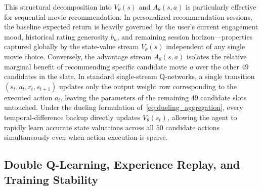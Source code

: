 This structural decomposition into $V_\theta(s)$ and $A_\theta(s, a)$ is particularly effective for sequential movie recommendation. In personalized recommendation sessions, the baseline expected return is heavily governed by the user's current engagement mood, historical rating generosity $b_u$, and remaining session horizon---properties captured globally by the state-value stream $V_\theta(s)$ independent of any single movie choice. Conversely, the advantage stream $A_\theta(s, a)$ isolates the relative marginal benefit of recommending specific candidate movie $a$ over the other $49$ candidates in the slate. In standard single-stream Q-networks, a single transition $(s_t, a_t, r_t, s_{t+1})$ updates only the output weight row corresponding to the executed action $a_t$, leaving the parameters of the remaining $49$ candidate slots untouched. Under the dueling formulation of~\eqref{eq:dueling_aggregation}, every temporal-difference backup directly updates $V_\theta(s_t)$, allowing the agent to rapidly learn accurate state valuations across all $50$ candidate actions simultaneously even when action execution is sparse.

\subsection{Double Q-Learning, Experience Replay, and Training Stability}
\label{subsec:ddqn_training}

